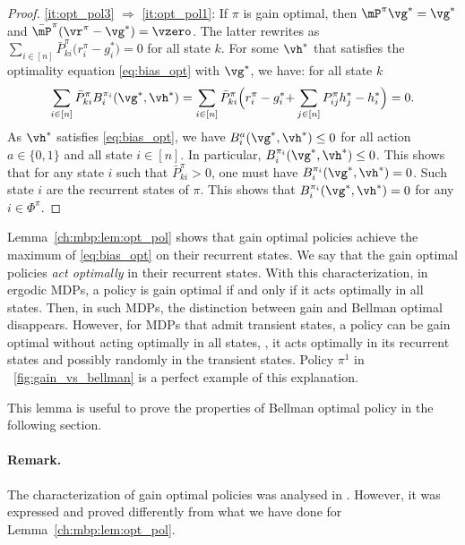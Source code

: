\begin{proof}
    \ref{it:opt_pol3} $\Rightarrow$ \ref{it:opt_pol1}: If $\pi$ is gain optimal, then $\mP^\pi \vg^*=\vg^*$ and $\bar{\mP}^\pi(\vr^\pi-\vg^*)=\vzero$.
    The latter rewrites as $\sum_{i\in[n]}\bar{P}^\pi_{ki}\Big(r^{\pi}_i-g^*_i\Big) =0$ for all state $k$. For some $\vh^*$ that satisfies the optimality equation \eqref{eq:bias_opt} with $\vg^*$, we have: for all state $k$
    \begin{align*}
        \sum_{i\in[n]}\bar{P}^\pi_{ki}B^{\pi_i}_i(\vg^*,\vh^*) = \sum_{i\in[n]}\bar{P}^\pi_{ki}\Big(r^{\pi}_i-g^*_i {+}\sum_{j\in[n]}P^{\pi}_{ij}h^*_j -h^*_i\Big) =0.
    \end{align*}
    As $\vh^*$ satisfies \eqref{eq:bias_opt}, we have $B^{a}_i(\vg^*,\vh^*) \le0$  for all action $a\in\{0,1\}$ and all state $i\in[n]$.
    In particular, $B^{\pi_i}_i(\vg^*,\vh^*) \le0$.
    This shows that for any state $i$ such that $\bar{P}^\pi_{ki}>0$, one must have $B^{\pi_i}_i(\vg^*,\vh^*) =0$.
    Such state $i$ are the recurrent states of $\pi$.
    This shows that $B^{\pi_i}_i(\vg^*,\vh^*) =0$ for any $i\in\Phi^\pi$.
\end{proof}

Lemma~\ref{ch:mbp:lem:opt_pol} shows that gain optimal policies achieve the maximum of \eqref{eq:bias_opt} on their recurrent states.
We say that the gain optimal policies \emph{act optimally} in their recurrent states.
With this characterization, in ergodic MDPs, a policy is gain optimal if and only if it acts optimally in all states.
Then, in such MDPs, the distinction between gain and Bellman optimal disappears.
However, for MDPs that admit transient states, a policy can be gain optimal without acting optimally in all states, \ie, it acts optimally in its recurrent states and possibly randomly in the transient states.
Policy $\pi^1$ in \figurename~\ref{fig:gain_vs_bellman} is a perfect example of this explanation.

This lemma is useful to prove the properties of Bellman optimal policy in the following section.

\paragraph{Remark.} The characterization of gain optimal policies was analysed in \cite{puterman2014markov, schweitzer1978functional}.
However, it was expressed and proved differently from what we have done for Lemma~\ref{ch:mbp:lem:opt_pol}.

